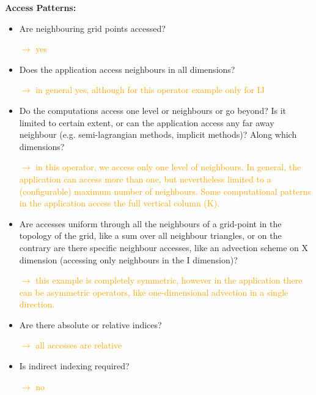 \documentclass[a4paper,10pt]{scrartcl}
\begin{document}
\textbf{Access Patterns:}\newline
\begin{itemize} 
	\item Are neighbouring grid points accessed?
	
	\textcolor{orange}{$\rightarrow$ yes}
	
	\item Does the application access neighbours in all dimensions? 
	
	\textcolor{orange}{$\rightarrow$ in general yes, although for this operator example only for IJ}
	
	\item Do the computations access one level or neighbours or go beyond? Is it limited to certain extent, or can the application access any far away neighbour (e.g. semi-lagrangian methods, implicit methods)? Along which dimensions?
	
	\textcolor{orange}{$\rightarrow$ in this operator, we access only one level of neighbours. In general, the application can access more than one, but nevertheless limited to a (configurable) maximum number of neighbours. Some computational
	patterns in the application access the full vertical column (K).}
	
	\item Are accesses uniform through all the neighbours of a grid-point in the topology of the grid, like a sum over all neighbour
	triangles, or on the contrary are there specific neighbour accesses, like an advection scheme on X dimension (accessing  only neighbours in the I dimension)?
	
	\textcolor{orange}{$\rightarrow$ this example is completely symmetric, however in the application there can be asymmetric operators, like one-dimensional advection in a single direction.}
	
	\item Are there absolute or relative indices?
	
	\textcolor{orange}{$\rightarrow$ all accesses are relative}
	
	\item Is indirect indexing required?
	
	\textcolor{orange}{$\rightarrow$ no}
\end{itemize}
\end{document}
